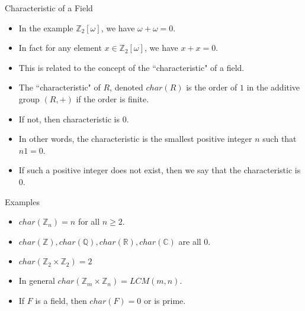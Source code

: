 \documentclass[ %
 10pt, xcolor={dvipsnames,svgnames,x11names,hyperref},
   hyperref={colorlinks=true,citecolor=green,linkcolor=DarkRed,urlcolor=ProcessBlue,anchorcolor=blue}
  ]{beamer}
\newenvironment{stepitemize}{\begin{itemize}[<+->]}{\end{itemize} }
\newcommand{\Z}{\mathbb{Z}}
\newcommand{\Q}{\mathbb{Q}}
\newcommand{\R}{\mathbb{R}}
\newcommand{\C}{\mathbb{C}}
\begin{document}
\begin{frame}{Characteristic of a Field}
    \begin{stepitemize}
        \item In the example $\Z_2[\omega]$, we have $\omega+\omega=0$. 
        \item In fact for any element $x \in \Z_2[\omega]$, we have $x+x=0$. 
        \item This is related to the concept of the ``characteristic" of a field.
        \item The ``characteristic" of $R$, denoted $char(R)$ is the order of $1$ in the additive group $(R,+)$ if the order is finite. 
        \item If not, then characteristic is $0$.
\item In other words, the characteristic is the smallest positive integer $n$ such that $n1 =0$. 
\item If such a positive integer does not exist, then we say that the characteristic is $0$. 
    \end{stepitemize}
\end{frame}

\begin{frame}{Examples}
\begin{stepitemize}
   \item $char(\Z_n)=n$ for all $n\geq 2$.
    \item $char(\Z), char(\Q), char(\R), char(\C)$ are all $0$.
   \item $char(\Z_2\times \Z_2) = 2$
    \item In general $char(\Z_m\times \Z_n) = LCM(m,n)$. 
\item If $F$ is a field, then $char(F)=0$ or is prime. 
\end{stepitemize}
\end{frame}
\end{document}
